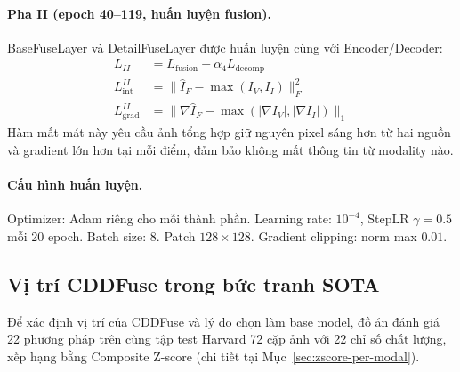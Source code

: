 \paragraph{Pha II (epoch 40--119, huấn luyện fusion).}
BaseFuseLayer và DetailFuseLayer được huấn luyện cùng với Encoder/Decoder:
\begin{align}
L_{II} &= L_{\mathrm{fusion}} + \alpha_4 L_{\mathrm{decomp}} \\
L_{\mathrm{int}}^{II} &= \|\hat{I}_F - \max(I_V, I_I)\|_F^2 \label{eq:lint} \\
L_{\mathrm{grad}}^{II} &= \|\nabla \hat{I}_F - \max(|\nabla I_V|, |\nabla I_I|)\|_1
\end{align}
Hàm mất mát này yêu cầu ảnh tổng hợp giữ nguyên pixel sáng hơn từ hai nguồn và gradient lớn hơn tại mỗi điểm, đảm bảo không mất thông tin từ modality nào.

\paragraph{Cấu hình huấn luyện.} Optimizer: Adam riêng cho mỗi thành phần. Learning rate: $10^{-4}$, StepLR $\gamma = 0.5$ mỗi 20 epoch. Batch size: 8. Patch $128\!\times\!128$. Gradient clipping: norm max $0.01$.

\subsection{Vị trí CDDFuse trong bức tranh SOTA}
\label{ssec:cddfuse-sota}

Để xác định vị trí của CDDFuse và lý do chọn làm base model, đồ án đánh giá 22 phương pháp trên cùng tập test Harvard 72 cặp ảnh với 22 chỉ số chất lượng, xếp hạng bằng Composite Z-score (chi tiết tại Mục~\ref{sec:zscore-per-modal}).

